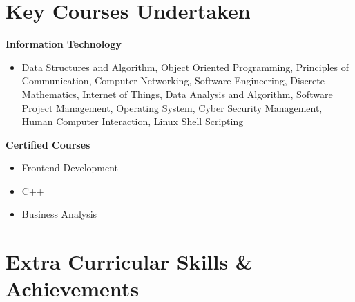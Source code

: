 \documentclass[10pt]{article}
\begin{document}
\vspace{-20pt}
\section*{{\LARGE \color{myblue}Key Courses Undertaken}\xfilll[0pt]{0.5pt}}
\vspace{-15pt}
\vspace{1.5mm}

\textbf{Information Technology}
\\[-0.6cm]
\begin{itemize}
	\item \noindent Data Structures and Algorithm, Object Oriented Programming, Principles of Communication, Computer Networking, Software Engineering, Discrete Mathematics, Internet of Things, Data Analysis and Algorithm, Software Project Management, Operating System, Cyber Security Management, Human Computer Interaction, Linux Shell Scripting
	\end{itemize}

\textbf{Certified Courses}
\\[-0.6cm]
\begin{itemize}
        \item \noindent Frontend Development
	\item \noindent C++
	\item \noindent Business Analysis
 
	\end{itemize}
	
\vspace{-20pt}
\section*{{\LARGE \color{myblue}Extra Curricular Skills \& Achievements}\xfilll[0pt]{0.5pt}}
\vspace{-15pt}
\vspace{1.5mm}
\end{document}
